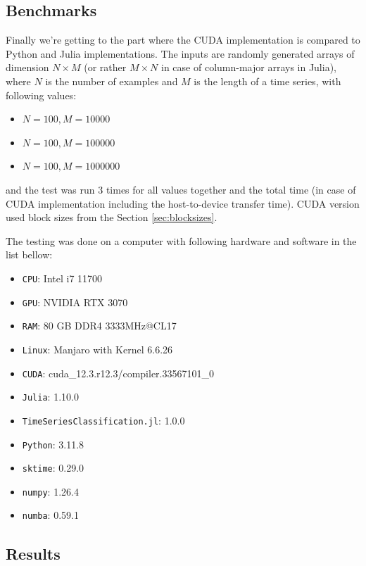 \documentclass{article}
\begin{document}
\subsection{Benchmarks}

Finally we're getting to the part where the CUDA implementation is compared to Python and Julia implementations.
The inputs are randomly generated arrays of dimension $N \times M$ (or rather $M \times N$ in case of column-major arrays in Julia), where $N$ is the number of examples and $M$ is the length of a time series, with following values:
\begin{itemize}
    \item $N = 100, M = 10000$
    \item $N = 100, M = 100000$
    \item $N = 100, M = 1000000$
\end{itemize}
and the test was run 3 times for all values together and the total time (in case of CUDA implementation including the host-to-device transfer time). CUDA version used block sizes from the Section \ref{sec:blocksizes}.

The testing was done on a computer with following hardware and software in the list bellow:
\begin{itemize}
    \item \texttt{CPU}: Intel i7 11700
    \item \texttt{GPU}: NVIDIA RTX 3070
    \item \texttt{RAM}: 80 GB DDR4 3333MHz@CL17
    \item \texttt{Linux}: Manjaro with Kernel 6.6.26
    \item \texttt{CUDA}: cuda\_12.3.r12.3/compiler.33567101\_0
    \item \texttt{Julia}: 1.10.0
    \item \texttt{TimeSeriesClassification.jl}: 1.0.0
    \item \texttt{Python}: 3.11.8
    \item \texttt{sktime}: 0.29.0
    \item \texttt{numpy}: 1.26.4
    \item \texttt{numba}: 0.59.1
\end{itemize}

\subsection{Results}
\end{document}
